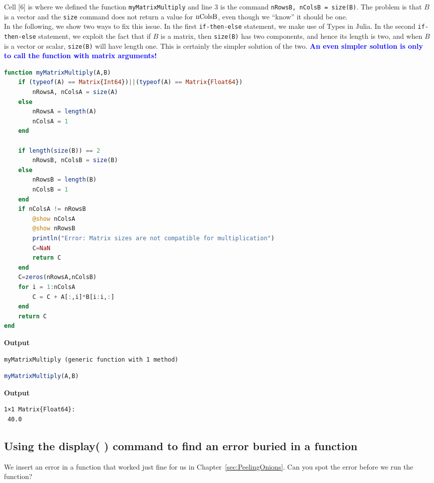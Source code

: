 Cell [6] is where we defined the function \texttt{myMatrixMultiply} and line 3 is the command \texttt{nRowsB, nColsB = size(B)}. The problem is that $B$ is a vector and the \texttt{size} command does not return a value for $\rm nColsB$, even though we ``know'' it should be one. \\

In the following, we show two ways to fix this issue. In the first \texttt{if-then-else} statement, we make use of Types in Julia. In the second \texttt{if-then-else} statement, we exploit the fact that if $B$ is a matrix, then \texttt{size(B)} has two components, and hence its length is two, and when $B$ is a vector or scalar, \texttt{size(B)} will have length one. This is certainly the simpler solution of the two. \textcolor{blue}{\bf An even simpler solution is only to call the function with matrix arguments!}  

\begin{lstlisting}[language=Julia,style=mystyle]
function myMatrixMultiply(A,B)
    if (typeof(A) == Matrix{Int64})||(typeof(A) == Matrix{Float64})
        nRowsA, nColsA = size(A)
    else
        nRowsA = length(A)
        nColsA = 1
    end

    if length(size(B)) == 2
        nRowsB, nColsB = size(B)
    else
        nRowsB = length(B)
        nColsB = 1
    end
    if nColsA != nRowsB
        @show nColsA
        @show nRowsB
        println("Error: Matrix sizes are not compatible for multiplication")
        C=NaN
        return C
    end
    C=zeros(nRowsA,nColsB)
    for i = 1:nColsA
        C = C + A[:,i]*B[i:i,:]
    end
    return C
end
\end{lstlisting}
\textbf{Output} 
\begin{verbatim}
myMatrixMultiply (generic function with 1 method)
\end{verbatim}


\begin{lstlisting}[language=Julia,style=mystyle]
myMatrixMultiply(A,B)
\end{lstlisting}
\textbf{Output} 
\begin{verbatim}
1×1 Matrix{Float64}:
 40.0
\end{verbatim}

\subsection{Using the display( ) command to find an error buried in a function}

We insert an error in a function that worked just fine for us in Chapter~\ref{sec:PeelingOnions}. Can you spot the error before we run the function? 

